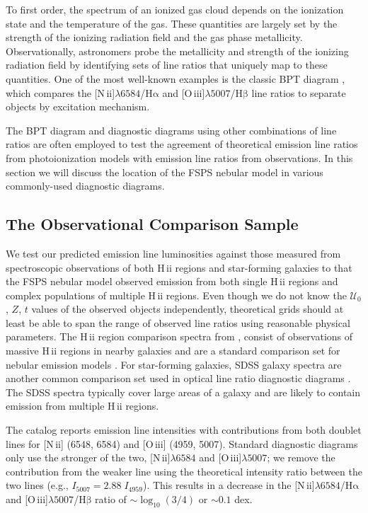 \documentclass[linenumbers, tighten, trackchanges]{aastex61}%
\newcommand{\FSPS}{{\sc FSPS}\xspace}
\newcommand{\logten}{\ensuremath{\log_{10}}}
\newcommand{\nii}{[N\,{\sc ii}]\xspace}
\newcommand{\oiii}{[O\,{\sc iii}]\xspace}
\newcommand{\ha}{\ensuremath{\mathrm{H\alpha}}}
\newcommand{\hb}{\ensuremath{\mathrm{H\beta}}}
\newcommand{\hii}{H\,{\sc ii}\xspace}
\newcommand\lam[1]{\ensuremath{\lambda #1}}
\newcommand{\U}{\ensuremath{\mathcal{U}_{0}}}
\newcommand\niiha{\nii{}\lam{6584}/\ha{}}
\newcommand\oiiihb{\oiii{}\lam{5007}/\hb{}}
\begin{document}
To first order, the spectrum of an ionized gas cloud depends on the ionization state and the temperature of the gas. These quantities are largely set by the strength of the ionizing radiation field and the gas phase metallicity. Observationally, astronomers probe the metallicity and strength of the ionizing radiation field by identifying sets of line ratios that uniquely  map to these quantities. One of the most well-known examples is the classic BPT diagram \citep{BPT}, which compares the \niiha{} and \oiiihb{} line ratios to separate objects by excitation mechanism.

The BPT diagram and diagnostic diagrams using other combinations of line ratios are often employed to test the agreement of theoretical emission line ratios from photoionization models with emission line ratios from observations. In this section we will discuss the location of the \FSPS nebular model in various commonly-used diagnostic diagrams.

\subsection{The Observational Comparison Sample}

We test our predicted emission line luminosities against those measured from spectroscopic observations of both \hii regions and star-forming galaxies to  that the \FSPS nebular model  observed emission from both single \hii regions and complex populations of multiple \hii regions. Even though we do not know the \U{}, $Z$, $t$ values of the observed objects independently, theoretical grids should at least be able to span the range of observed line ratios using reasonable physical parameters. The \hii region comparison spectra from \citet{vanzee98}, consist of observations of massive \hii regions in nearby galaxies and are a standard comparison set for nebular emission models \citep{Dopita00, Kewley06, Levesque10, Dopita13}. For star-forming galaxies, SDSS galaxy spectra are another common comparison set used in optical line ratio diagnostic diagrams \citep{Dopita00, Kewley06, Levesque10}. The SDSS spectra typically cover large areas of a galaxy and are likely to contain emission from multiple \hii regions.

The \citet{vanzee98} catalog reports emission line intensities with contributions from both doublet lines for \nii{} (6548, 6584) and \oiii{} (4959, 5007). Standard diagnostic diagrams only use the stronger of the two, \nii{}\lam{6584} and \oiii{}\lam{5007}; we remove the contribution from the weaker line using the theoretical intensity ratio between the two lines (e.g., $I_{5007} = 2.88\;I_{4959}$). This results in a decrease in the \niiha{} and \oiiihb{} ratio of $\sim \logten \left(3/4\right)$ or $\sim 0.1$ dex.
\end{document}
